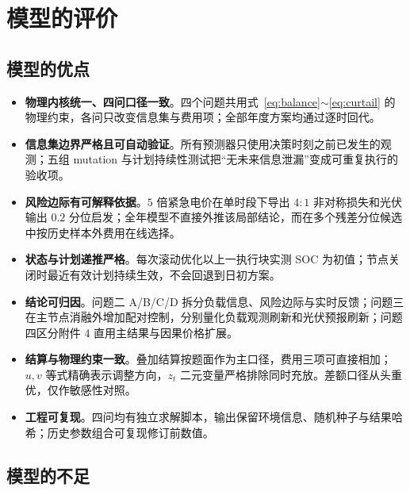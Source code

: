 \section{模型的评价}

\subsection{模型的优点}

\begin{itemize}[itemsep=2pt, topsep=3pt]
	\item \textbf{物理内核统一、四问口径一致}。四个问题共用式~\eqref{eq:balance}$\sim$\eqref{eq:curtail} 的物理约束，各问只改变信息集与费用项；全部年度方案均通过逐时回代。
	\item \textbf{信息集边界严格且可自动验证}。所有预测器只使用决策时刻之前已发生的观测；五组 mutation 与计划持续性测试把“无未来信息泄漏”变成可重复执行的验收项。
	\item \textbf{风险边际有可解释依据}。$5$ 倍紧急电价在单时段下导出 $4:1$ 非对称损失和光伏输出 $0.2$ 分位启发；全年模型不直接外推该局部结论，而在多个残差分位候选中按历史样本外费用在线选择。
	\item \textbf{状态与计划递推严格}。每次滚动优化以上一执行块实测 SOC 为初值；节点关闭时最近有效计划持续生效，不会回退到日初方案。
	\item \textbf{结论可归因}。问题二 A/B/C/D 拆分负载信息、风险边际与实时反馈；问题三在主节点消融外增加配对控制，分别量化负载观测刷新和光伏预报刷新；问题四区分附件 4 直用主结果与因果价格扩展。
	\item \textbf{结算与物理约束一致}。叠加结算按题面作为主口径，费用三项可直接相加；$u,v$ 等式精确表示调整方向，$z_t$ 二元变量严格排除同时充放。差额口径从头重优，仅作敏感性对照。
	\item \textbf{工程可复现}。四问均有独立求解脚本，输出保留环境信息、随机种子与结果哈希；历史参数组合可复现修订前数值。
\end{itemize}

\subsection{模型的不足}

